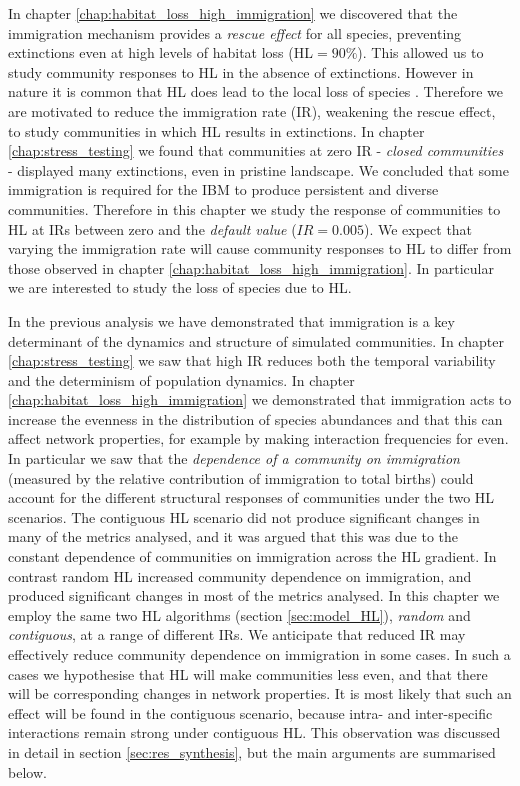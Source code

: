 In chapter \ref{chap:habitat_loss_high_immigration} we discovered that the immigration mechanism provides a \emph{rescue effect} for all species, preventing extinctions even at high levels of habitat loss (HL$=90\%$). This allowed us to study community responses to HL in the absence of extinctions. However in nature it is common that HL does lead to the local loss of species \cite{foley2005global}. Therefore we are motivated to reduce the immigration rate (IR), weakening the rescue effect, to study communities in which HL results in extinctions. In chapter \ref{chap:stress_testing} we found that communities at zero IR - \emph{closed communities} - displayed many extinctions, even in pristine landscape. We concluded that some immigration is required for the IBM to produce persistent and diverse communities. Therefore in this chapter we study the response of communities to HL at IRs between zero and the \emph{default value} ($IR=0.005$). We expect that varying the immigration rate will cause community responses to HL to differ from those observed in chapter \ref{chap:habitat_loss_high_immigration}. In particular we are interested to study the loss of species due to HL.

In the previous analysis we have demonstrated that immigration is a key determinant of the dynamics and structure of simulated communities. In chapter \ref{chap:stress_testing} we saw that high IR reduces both the temporal variability and the determinism of population dynamics. In chapter \ref{chap:habitat_loss_high_immigration} we demonstrated that immigration acts to increase the evenness in the distribution of species abundances and that this can affect network properties, for example by making interaction frequencies for even. In particular we saw that the \emph{dependence of a community on immigration} (measured by the relative contribution of immigration to total births) could account for the different structural responses of communities under the two HL scenarios. The contiguous HL scenario did not produce significant changes in many of the metrics analysed, and it was argued that this was due to the constant dependence of communities on immigration across the HL gradient. In contrast random HL increased community dependence on immigration, and produced significant changes in most of the metrics analysed. In this chapter we employ the same two HL algorithms (section \ref{sec:model_HL}), \emph{random} and \emph{contiguous}, at a range of different IRs. We anticipate that reduced IR may effectively reduce community dependence on immigration in some cases. In such a cases we hypothesise that HL will make communities less even, and that there will be corresponding changes in network properties. It is most likely that such an effect will be found in the contiguous scenario, because intra- and inter-specific interactions remain strong under contiguous HL. This observation was discussed in detail in section \ref{sec:res_synthesis}, but the main arguments are summarised below.

